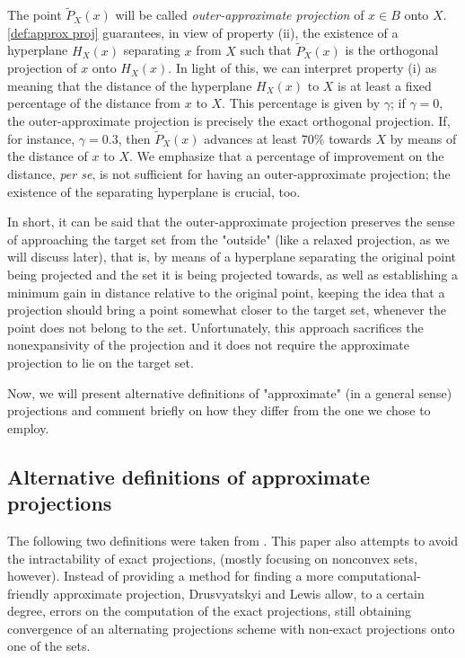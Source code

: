 \documentclass[smallextended,numbook,nospthms]{svjour3}
\theoremstyle{plain}
\theoremstyle{definition}
\begin{document}
The point $\tilde{P}_{X}(x)$ will be called \emph{outer-approximate projection} of $x \in B$ onto $X$. \cref{def:approx proj} guarantees, in view of property (ii), the existence of a hyperplane $H_{X}(x)$ separating $x$ from $X$ such that $\tilde{P}_{X}(x)$ is the orthogonal projection of $x$ onto $H_{X}(x)$. In light of this, we can interpret property (i) as meaning that the distance of the hyperplane $H_{X}(x)$ to $X$ is at least a fixed percentage of the distance from $x$ to $X$. This percentage is given by $\gamma$; if $\gamma=0$, the outer-approximate projection is precisely the exact orthogonal projection. If, for instance, $\gamma = 0.3$, then $\tilde{P}_{X}(x)$ advances at least $70 \%$ towards $X$ by means of the distance of $x$ to $X$. We emphasize that a percentage of improvement on the distance, \emph{per se}, is not sufficient for having an outer-approximate projection; the existence of the separating hyperplane is crucial, too.

In short, it can be said that the outer-approximate projection preserves the sense of approaching the target set from the "outside" (like a relaxed projection, as we will discuss later), that is, by means of a hyperplane separating the original point being projected and the set it is being projected towards, as well as establishing a minimum gain in distance relative to the original point, keeping the idea that a projection should bring a point somewhat closer to the target set, whenever the point does not belong to the set. Unfortunately, this approach sacrifices the nonexpansivity of the projection and it does not require the approximate projection to lie on the target set.

Now, we will present alternative definitions of "approximate" (in a general sense) projections and comment briefly on how they differ from the one we chose to employ.

\subsection{Alternative definitions of approximate projections}

The following two definitions were taken from \cite{Drusvyatskiy:2018}. This paper also attempts to avoid the intractability of exact projections, (mostly focusing on nonconvex sets, however). Instead of providing a method for finding a more computational-friendly approximate projection, Drusvyatskyi and Lewis allow, to a certain degree, errors on the computation of the exact projections, still obtaining convergence of an alternating projections scheme with non-exact projections onto one of the sets.
\end{document}
